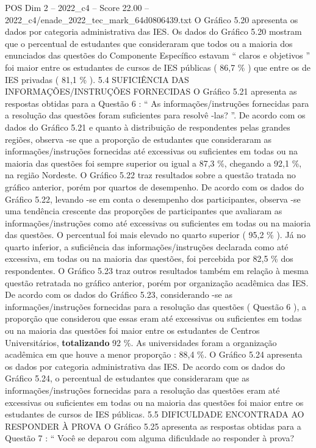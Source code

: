 \begin{textsample}{POS Dim 2 – 2022\_c4 – Score 22.00 – 2022\_c4/enade\_2022\_tec\_mark\_64d0806439.txt}
O Gráfico 5.20 apresenta os dados por categoria administrativa das IES.
Os dados do Gráfico 5.20 mostram que o percentual de estudantes que consideraram que todos ou a maioria dos enunciados das questões do Componente Específico estavam “ claros e objetivos ” foi maior entre os estudantes de cursos de IES públicas ( 86,7 \% ) que entre os de IES privadas ( 81,1 \% ). 5.4 SUFICIÊNCIA DAS INFORMAÇÕES/INSTRUÇÕES FORNECIDAS O Gráfico 5.21 apresenta as respostas obtidas para a Questão 6 : “ As informações/instruções fornecidas para a resolução das questões foram suficientes para resolvê -las? ”.
De acordo com os dados do Gráfico 5.21 e quanto à distribuição de respondentes pelas grandes regiões, observa -se que a proporção de estudantes que consideraram as informações/instruções fornecidas até excessivas ou suficientes em todas ou na maioria das questões foi sempre superior ou igual a 87,3 \%, chegando a 92,1 \%, na região Nordeste.
O Gráfico 5.22 traz resultados sobre a questão tratada no gráfico anterior, porém por quartos de desempenho.
De acordo com os dados do Gráfico 5.22, levando -se em conta o desempenho dos participantes, observa -se uma tendência crescente das proporções de participantes que avaliaram as informações/instruções como até excessivas ou suficientes em todas ou na maioria das questões.
O percentual foi mais elevado no quarto superior ( 95,2 \% ).
Já no quarto inferior, a suficiência das informações/instruções declarada como até excessiva, em todas ou na maioria das questões, foi percebida por 82,5 \% dos respondentes.
O Gráfico 5.23 traz outros resultados também em relação à mesma questão retratada no gráfico anterior, porém por organização acadêmica das IES.
De acordo com os dados do Gráfico 5.23, considerando -se as informações/instruções fornecidas para a resolução das questões ( Questão 6 ), a proporção que considerou que essas eram até excessivas ou suficientes em todas ou na maioria das questões foi maior entre os estudantes de Centros Universitários, \textbf{totalizando} 92 \%.
As universidades foram a organização acadêmica em que houve a menor proporção : 88,4 \%.
O Gráfico 5.24 apresenta os dados por categoria administrativa das IES.
De acordo com os dados do Gráfico 5.24, o percentual de estudantes que consideraram que as informações/instruções fornecidas para a resolução das questões eram até excessivas ou suficientes em todas ou na maioria das questões foi maior entre os estudantes de cursos de IES públicas. 5.5 DIFICULDADE ENCONTRADA AO RESPONDER À PROVA O Gráfico 5.25 apresenta as respostas obtidas para a Questão 7 : “ Você se deparou com alguma dificuldade ao responder à prova?

\end{textsample}
